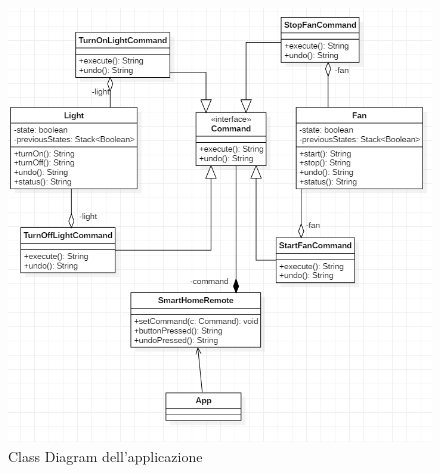 \documentclass{article}
\begin{document}
\begin{figure}[ht]
\caption{Class Diagram dell'applicazione}
\centering
\includegraphics[width=\textwidth]{images/ApprofondimentoUML.PNG}
\end{figure}
\end{document}
